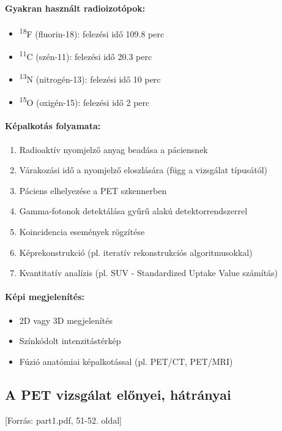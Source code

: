 \documentclass[a4paper,12pt]{article}
\begin{document}
\paragraph{Gyakran használt radioizotópok:} \begin{itemize} \item \textsuperscript{18}F (fluorin-18): felezési idő 109.8 perc \item \textsuperscript{11}C (szén-11): felezési idő 20.3 perc \item \textsuperscript{13}N (nitrogén-13): felezési idő 10 perc \item \textsuperscript{15}O (oxigén-15): felezési idő 2 perc \end{itemize}

\paragraph{Képalkotás folyamata:} \begin{enumerate} \item Radioaktív nyomjelző anyag beadása a páciensnek \item Várakozási idő a nyomjelző eloszlására (függ a vizsgálat típusától) \item Páciens elhelyezése a PET szkennerben \item Gamma-fotonok detektálása gyűrű alakú detektorrendszerrel \item Koincidencia események rögzítése \item Képrekonstrukció (pl. iteratív rekonstrukciós algoritmusokkal) \item Kvantitatív analízis (pl. SUV - Standardized Uptake Value számítás) \end{enumerate}

\paragraph{Képi megjelenítés:} \begin{itemize} \item 2D vagy 3D megjelenítés \item Színkódolt intenzitástérkép \item Fúzió anatómiai képalkotással (pl. PET/CT, PET/MRI) \end{itemize}

\subsection{A PET vizsgálat előnyei, hátrányai} [Forrás: part1.pdf, 51-52. oldal]
\end{document}
